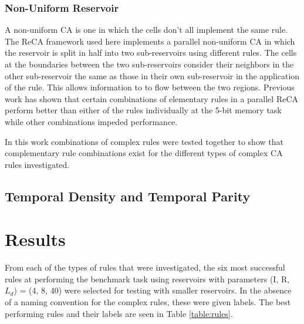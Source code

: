 \documentclass{elsarticle}
\begin{document}
\begin{multicols}{2}
\subsubsection{Non-Uniform Reservoir}
A non-uniform CA is one in which the cells don't all implement the same rule.  
    The ReCA framework used here implements a parallel non-uniform CA in which 
    the reservoir is split in half into two sub-reservoirs  using different 
    rules.  The cells at the boundaries between  the two sub-reservoirs 
    consider their neighbors in the other sub-reservoir the same as those in 
    their own sub-reservoir in the application of the rule. This allows 
    information to to flow between the two regions. Previous work has shown 
    that certain combinations of elementary rules in a parallel ReCA perform 
    better than either of the rules individually at the 5-bit memory task while 
    other combinations impeded performance\cite{nichele2017reservoir}.  \par In 
    this work combinations of complex rules were tested together to show that 
    complementary rule combinations exist for the different types of complex CA 
    rules investigated.  
    
\subsection{Temporal Density and Temporal Parity}

\section{Results}\label{results}
From each of the types of rules that were investigated, the six most successful 
rules at performing the benchmark task using reservoirs with parameters (I, R, 
        $L_{d}$) = (4, 8, 40) were selected for testing with smaller  
reservoirs. In the absence of a naming convention for the complex rules, these 
were given labels. The best performing rules and their labels are seen in Table
\ref{table:rules}. \par


\end{multicols}
\end{document}
